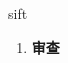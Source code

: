 
\begin{frame}
{\huge sift}
\begin{center}
\begin{enumerate}\Large
  \item \textbf{审查}
\end{enumerate}
\end{center}
\end{frame}
